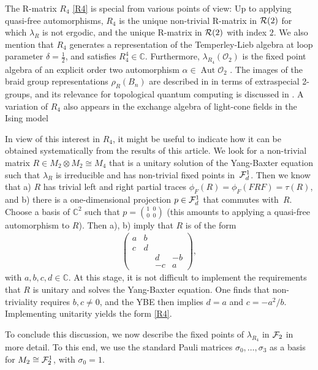 \documentclass[12pt,a4paper]{amsart}
\numberwithin{equation}{section}
\theoremstyle{remark}
\def\Aut{\operatorname{Aut}}
\newcommand{\ot}{\otimes}
\newcommand{\Cl}{\mathbb{C}}
\def\C{\mathbb{C}}
\newcommand{\la}{\lambda}
\newcommand{\CO}[0]{\mathcal{O}} \newcommand{\CP}[0]{\mathcal{P}}
\begin{document}
The R-matrix $R_4$ \eqref{R4} is special from various points of view: Up to applying quasi-free automorphisms, $R_4$  is the unique non-trivial R-matrix in $\mathcal{R}(2)$ for which $\la_R$ is not ergodic, and the unique R-matrix in $\mathcal{R}(2)$ with index $2$. We also mention that $R_4$ generates a representation of the Temperley-Lieb algebra at loop parameter $\delta=\frac{1}{2}$, and satisfies $R_4^4\in\C$. Furthermore, $\la_{R_4}(\CO_2)$ is the fixed point algebra of an explicit order two automorphism $\alpha\in\Aut\CO_2$ \cite{ContiFidaleo:2000}. The images of the braid group representations $\rho_R(B_n)$ are described in \cite{FrankoRowellWang:2006} in terms of extraspecial 2-groups, and its relevance for topological quantum computing is discussed in \cite{KauffmanLomonacoJr:2004_2}. A variation of $R_4$ also appears in the exchange algebra of light-cone fields in the Ising model \cite{RehrenSchroer:1987}

In view of this interest in $R_4$, it might be useful to indicate how it can be obtained systematically from the results of this article. We look for a non-trivial matrix $R\in M_2\ot M_2\cong M_4$ that is a unitary solution of the Yang-Baxter equation such that $\la_R$ is irreducible and has non-trivial fixed points in~$\mathcal{F}_d^1$. Then we know that a) $R$ has trivial left and right partial traces $\phi_F(R)=\phi_F(FRF)=\tau(R)$, and b) there is a one-dimensional projection $p\in\mathcal{F}_d^1$ that commutes with~$R$. Choose a basis of $\Cl^2$ such that $p=\genfrac{(}{)}{0pt}{1}{1\;\;0}{0\;\;0}$ (this amounts to applying a quasi-free automorphism to $R$). Then a), b) imply that $R$ is of the form
\begin{align}
	\left(
            \begin{array}{rrrr}
            a & b \\
            c & d \\
            &&d&-b\\
            &&-c & a
            \end{array}
        \right),
\end{align}
with $a,b,c,d\in\Cl$. At this stage, it is not difficult to implement the requirements that $R$ is unitary and solves the Yang-Baxter equation. One finds that non-triviality requires $b,c\neq0$, and the YBE then implies $d=a$ and $c=-a^2/b$. Implementing unitarity yields the form \eqref{R4}.

\medskip

To conclude this discussion, we now describe the fixed points of $\la_{R_4}$ in $\mathcal{F}_2$ in more detail. To this end, we use the standard Pauli matrices $\sigma_0,\ldots,\sigma_3$ as a basis for $M_2\cong\mathcal{F}_2^1$, with $\sigma_0=1$.
\end{document}
